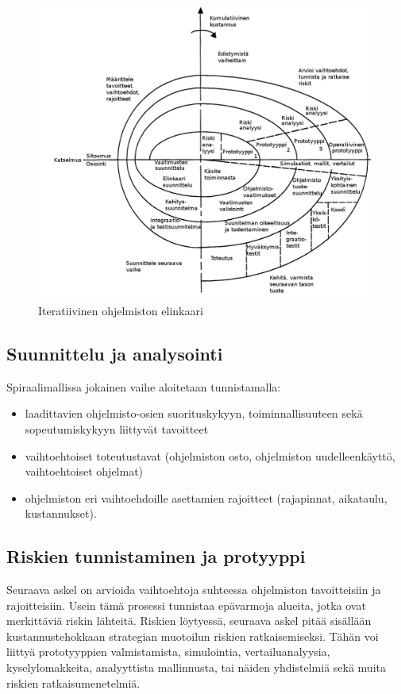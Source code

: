 \documentclass[finnish]{tktltiki2}
\theoremstyle{definition}
\theoremstyle{remark}
\begin{document}
\begin{figure}[h!]
  \caption{Iteratiivinen ohjelmiston elinkaari}
  \centering
    \includegraphics[width=\textwidth]{spiral}
\end{figure}

\subsection*{Suunnittelu ja analysointi}

Spiraalimallissa jokainen vaihe aloitetaan tunnistamalla:
\begin{itemize}
  \item laadittavien ohjelmisto-osien suorituskykyyn, toiminnallisuuteen sekä sopeutumiskykyyn liittyvät tavoitteet
  \item vaihtoehtoiset toteutustavat (ohjelmiston osto, ohjelmiston uudelleenkäyttö, vaihtoehtoiset ohjelmat)
  \item ohjelmiston eri vaihtoehdoille asettamien rajoitteet (rajapinnat, aikataulu, kustannukset)\cite{BOE88}.
\end{itemize}

\subsection*{Riskien tunnistaminen ja protyyppi}

Seuraava askel on arvioida vaihtoehtoja suhteessa ohjelmiston tavoitteisiin ja rajoitteisiin. Usein tämä prosessi tunnistaa epävarmoja alueita, jotka ovat merkittäviä riskin lähteitä. Riskien löytyessä, seuraava askel pitää sisällään kustannustehokkaan strategian muotoilun riskien ratkaisemiseksi. Tähän voi liittyä prototyyppien valmistamista, simulointia, vertailuanalyysia, kyselylomakkeita, analyyttista mallinnusta, tai näiden yhdistelmiä sekä muita riskien ratkaisumenetelmiä\cite{BOE88}.
\end{document}
